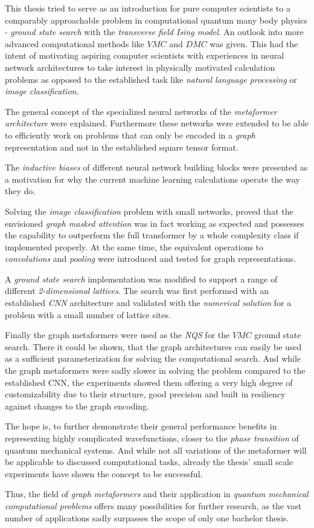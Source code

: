 This thesis tried to serve as an introduction for pure computer scientists to a comparably approachable problem in computational quantum many body physics - \emph{ground state search} with the \emph{transverse field Ising model}.
An outlook into more advanced computational methods like $VMC$ and $DMC$ was given.
This had the intent of motivating aspiring computer scientists with experiences in neural network architectures to take interest in physically motivated calculation problems as opposed to the established task like \emph{natural language processing} or \emph{image classification}.

The general concept of the specialized neural networks of the \emph{metaformer architecture} were explained.
Furthermore these networks were extended to be able to efficiently work on problems that can only be encoded in a \emph{graph} representation and not in the established square tensor format.

The \emph{inductive biases} of different neural network building blocks were presented as a motivation for why the current machine learning calculations operate the way they do.

Solving the \emph{image classification} problem with small networks, proved that the envisioned \emph{graph masked attention} was in fact working as expected and possesses the capability to outperform the full transformer by a whole complexity class if implemented properly.
At the same time, the equivalent operations to \emph{convolutions} and \emph{pooling} were introduced and tested for graph representations.

A \emph{ground state search} implementation was modified to support a range of different \emph{2-dimensional lattices}.
The search was first performed with an established \emph{CNN} architecture and validated with the \emph{numerical solution} for a problem with a small number of lattice sites.

Finally the graph metaformers were used as the \emph{NQS} for the $VMC$ ground state search.
There it could be shown, that the graph architectures can easily be used as a sufficient parameterization for solving the computational search.
And while the graph metaformers were sadly slower in solving the problem compared to the established CNN, the experiments showed them offering a very high degree of customizability due to their structure, good precision and built in resiliency against changes to the graph encoding.

The hope is, to further demonstrate their general performance benefits in representing highly complicated wavefunctions, closer to the \emph{phase transition} of quantum mechanical systems.
And while not all variations of the metaformer will be applicable to discussed computational tasks, already the thesis' small scale experiments have shown the concept to be successful.

Thus, the field of \emph{graph metaformers} and their application in \emph{quantum mechanical computational problems} offers many possibilities for further research, as the vast number of applications sadly surpasses the scope of only one bachelor thesis.
